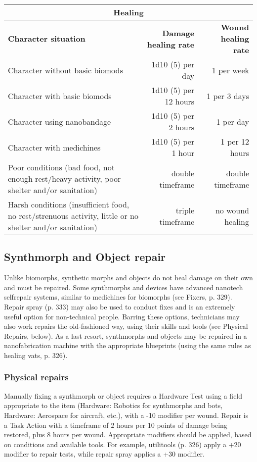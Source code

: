 \begin{table}
\begin{tabularx}{\textwidth}{|X|r|r|}
\hline
\multicolumn{3}{|c|}{\textbf{Healing}} \\
\hline
\textbf{Character situation}		& \textbf{Damage healing rate}	& \textbf{Wound healing rate} \\
\hline
Character without basic biomods	& 1d10 (5) per day 				& 1 per week				\\
\hline
Character with basic biomods		& 1d10 (5) per 12 hours			& 1 per 3 days				\\
\hline
Character using nanobandage		& 1d10 (5) per 2 hours			& 1 per day				\\
\hline
Character with medichines		& 1d10 (5) per 1 hour			& 1 per 12 hours			\\
\hline
Poor conditions (bad food, not enough rest/heavy activity, poor shelter and/or sanitation) & double timeframe & double timeframe \\
\hline
Harsh conditions (insufficient food, no rest/strenuous activity, little or no shelter and/or sanitation) & triple timeframe & no wound healing \\
\hline
\end{tabularx}
\label{tab:healing}
\end{table}


\subsection{Synthmorph and Object repair}

Unlike biomorphs, synthetic morphs and objects do not heal damage on their own and must be repaired. Some synthmorphs and devices have advanced nanotech selfrepair systems, similar to medichines for biomorphs (see Fixers, p. 329). Repair spray (p. 333) may also be used to conduct fixes and is an extremely useful option for non-technical people. Barring these options, technicians may also work repairs the old-fashioned way, using their skills and tools (see Physical Repairs, below). As a last resort, synthmorphs and objects may be repaired in a nanofabrication machine with the appropriate blueprints (using the same rules as healing vats, p. 326).

\subsubsection{Physical repairs}

Manually fixing a synthmorph or object requires a Hardware Test using a field appropriate to the item (Hardware: Robotics for synthmorphs and bots, Hardware: Aerospace for aircraft, etc.), with a -10 modifier per wound. Repair is a Task Action with a timeframe of 2 hours per 10 points of damage being restored, plus 8 hours per wound. Appropriate modifiers should be applied, based on conditions and available tools. For example, utilitools (p. 326) apply a +20 modifier to repair tests, while repair spray applies a +30 modifier.

